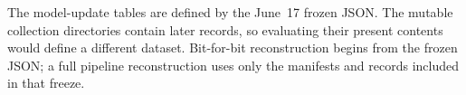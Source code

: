 The model-update tables are defined by the June~17 frozen JSON. The mutable collection
directories contain later records, so evaluating their present contents would
define a different dataset. Bit-for-bit reconstruction begins from the frozen
JSON; a full pipeline reconstruction uses only the manifests and records included
in that freeze.

